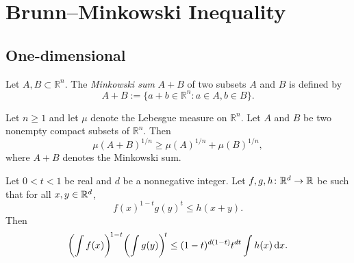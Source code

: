 %

\chapter{Brunn--Minkowski Inequality}

\section{One-dimensional}

\begin{definition}
    Let \(A, B \subset \mathbb{R}^n\). The \textit{Minkowski sum} \(A+B\) of two subsets \(A\) and \(B\) is defined by
    \begin{equation*}
        A+B:= \{a+b\in\mathbb{R}^n : a \in A, b \in B\}.
    \end{equation*}
\end{definition}

\begin{theorem}
    Let \(n \geq 1\) and let \(\mu\) denote the Lebesgue measure on \(\mathbb{R}^n\). Let \(A\) and \(B\) be two nonempty compact subsets of \(\mathbb{R}^n\). Then
    \begin{equation*}
        \mu(A+B)^{1/n} \geq \mu(A)^{1/n} + \mu(B)^{1/n},
    \end{equation*}
    where \(A+B\) denotes the Minkowski sum.
\end{theorem}

\begin{theorem}
    \label{prekopa_leindler}
    Let \(0<t<1\) be real and \(d\) be a nonnegative integer. Let \(f,g,h\colon \mathbb{R}^d\to \mathbb{R}\) be such that for all \(x,y\in \mathbb{R}^d\),
    \[
        f(x)^{1-t} g(y)^{t} \le h(x+y).
    \]
    Then
    \[
        \biggl( \int f(x) \biggr)^{\!1-t} \biggl( \int g(y) \biggr)^{\!t} \le (1-t)^{d(1-t)} t^{dt} \int h(x) \mathop{}\!\mathrm{d} x.
    \]
\end{theorem}


